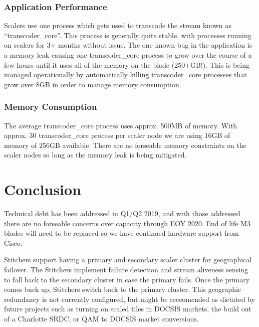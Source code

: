 \documentclass{article}
\begin{document}
\subsubsection{Application Performance}
\label{SECTION-APPPerf}

Scalers use one process which gets used to transcode the stream known as ``transcoder\_core''. This process is generally quite stable, with processes running on scalers for 3+ months without issue. The one known bug in the application is a memory leak causing one transcoder\_core process to grow over the course of a few hours until it uses all of the memory on the blade (250+GB!). This is being managed operationally by automatically killing transcoder\_core processes that grow over 8GB in order to manage memory consumption. 

\subsubsection{Memory Consumption}
\label{SECTION-Memory}

The average transcoder\_core process uses approx. 500MB of memory. With approx. 30 transcoder\_core process per scaler node we are using 16GB of memory of 256GB available. There are no forseable memory constraints on the scaler nodes so long as the memory leak is being mitigated. 



\section{Conclusion}
\label{SECTION-Conclusion}

Technical debt has been addressed in Q1/Q2 2019, and with those addressed there are no forseable concerns over capacity through EOY 2020. End of life M3 blades will need to be replaced so we have continued hardware support from Cisco. 

Stitchers support having a primary and secondary scaler cluster for geographical failover. The Stitchers implement failure detection and stream aliveness sensing to fall back to the secondary cluster in case the primary fails. Once the primary comes back up, Stitchers switch back to the primary cluster. This geographic redundancy is not currently configured, but might be reccomended as dictated by future projects such as turning on scaled tiles in DOCSIS markets, the build out of a Charlotte SRDC, or QAM to DOCSIS market conversions.
\end{document}
